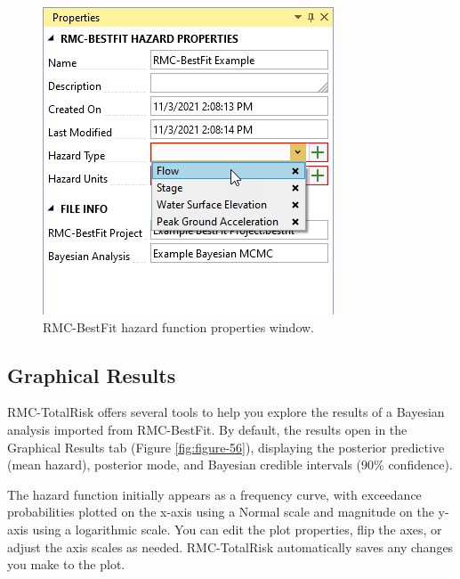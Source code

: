 \documentclass[
]{book}
\begin{document}
\begin{figure}

{\centering \includegraphics{images/figure55} 

}

\caption{RMC-BestFit hazard function properties window.}\label{fig:figure-55}
\end{figure}

\hypertarget{graphical-results}{%
\subsection{Graphical Results}\label{graphical-results}}

RMC-TotalRisk offers several tools to help you explore the results of a Bayesian analysis imported from RMC-BestFit. By default, the results open in the Graphical Results tab (Figure \ref{fig:figure-56}), displaying the posterior predictive (mean hazard), posterior mode, and Bayesian credible intervals (90\% confidence).

The hazard function initially appears as a frequency curve, with exceedance probabilities plotted on the x-axis using a Normal scale and magnitude on the y-axis using a logarithmic scale. You can edit the plot properties, flip the axes, or adjust the axis scales as needed. RMC-TotalRisk automatically saves any changes you make to the plot.
\end{document}
